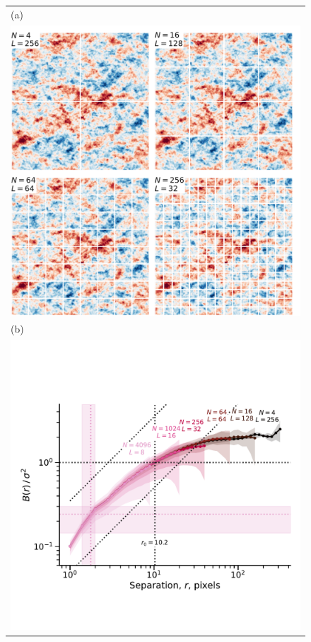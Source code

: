 \documentclass[fleqn,usenatbib, useAMS, a4paper]{mnras}
\begin{document}
\begin{figure}
  \begin{tabular}{@{} l @{}}
    (a)\\
    \includegraphics[width=\linewidth]{Figures/fake-3d-finite-box-images-ems-fluct_sigE_1}
    \\[\bigskipamount]
    (b)\\ \includegraphics[width=\linewidth]{Figures/fake-3d-finite-box-strucfunc-ems-fluct_sigE_1}

\end{tabular}
\end{figure}
\end{document}
